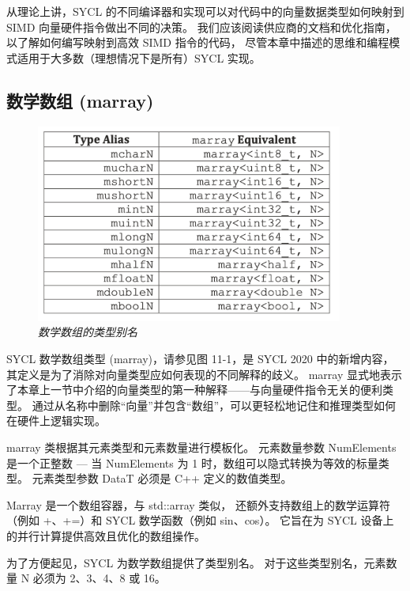 \begin{remark}[其他实现的可能！]
从理论上讲，SYCL 的不同编译器和实现可以对代码中的向量数据类型如何映射到 SIMD 向量硬件指令做出不同的决策。
我们应该阅读供应商的文档和优化指南，以了解如何编写映射到高效 SIMD 指令的代码，
尽管本章中描述的思维和编程模式适用于大多数（理想情况下是所有）SYCL 实现。
\end{remark}

\subsection{数学数组 (marray)}
\begin{figure}[H]
	\centering
	\includegraphics[width=0.9\textwidth]{figs/F11.1.png}
	\caption{\textit{数学数组的类型别名 }}
\end{figure}

SYCL 数学数组类型 (marray)，请参见图 11-1，是 SYCL 2020 中的新增内容，
其定义是为了消除对向量类型应如何表现的不同解释的歧义。 
marray 显式地表示了本章上一节中介绍的向量类型的第一种解释——与向量硬件指令无关的便利类型。 
通过从名称中删除“向量”并包含“数组”，可以更轻松地记住和推理类型如何在硬件上逻辑实现。

marray 类根据其元素类型和元素数量进行模板化。 
元素数量参数 NumElements 是一个正整数 — 当 NumElements 为 1 时，数组可以隐式转换为等效的标量类型。 
元素类型参数 DataT 必须是 C++ 定义的数值类型。

Marray 是一个数组容器，与 std::array 类似，
还额外支持数组上的数学运算符（例如 +、+=）和 SYCL 数学函数（例如 sin、cos）。 
它旨在为 SYCL 设备上的并行计算提供高效且优化的数组操作。

为了方便起见，SYCL 为数学数组提供了类型别名。 
对于这些类型别名，元素数量 N 必须为 2、3、4、8 或 16。

